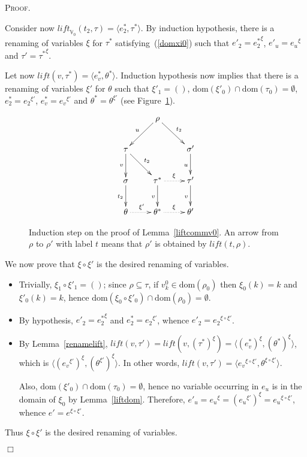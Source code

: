 \documentclass{article}
\newenvironment{proof}{\smallskip\textsc{Proof.}}{\hspace*{\fill}$\Box$}
\newcommand{\V}{{\mathbb V}}
\newcommand{\liftv}[1]{\ensuremath{\mathit{lift}_{\V_{#1}}}}
\newcommand{\lift}{\ensuremath{\mathit{lift}}}
\newcommand{\dom}{\ensuremath{\mathrm{dom}}}
\newcommand{\renamevar}[2]{\ensuremath{{#1}^{#2}}}
\newcommand{\isrenamevar}[3]{\ensuremath{{#1}=\renamevar{#2}{#3}}}
\newcommand{\idn}{()}
\begin{document}
\begin{proof}
\begin{enumerate}
Consider now $\liftv0(t_2,\tau)=\langle e^\ast_2,\tau^\ast\rangle$.
By induction hypothesis, there is a renaming of variables $\xi$ for
$\tau^\ast$ satisfying~(\ref{domxi0}) such that
{\isrenamevar{e'_2}{e^\ast_2}\xi}, {\isrenamevar{e'_u}{e_u}\xi} and
{\isrenamevar{\tau'}{\tau^\ast}\xi}.

Let now $\lift(v,\tau^\ast)=\langle e^\ast_v,\theta^\ast\rangle$.
Induction hypothesis now implies that there is a renaming of variables
$\xi'$ for $\theta$ such that $\xi'_1=\idn$,
$\dom(\xi'_0)\cap\dom(\tau_0)=\emptyset$,
{\isrenamevar{e^\ast_2}{e_2}{\xi'}},
{\isrenamevar{e^\ast_v}{e_v}{\xi'}} and
{\isrenamevar{\theta^\ast}\theta{\xi'}} (see
Figure~\ref{fig:liftcommv0}).
\begin{figure}[htb]
\[\xymatrix{
 & \rho \ar[dl]_{u} \ar[dr]^{t_2} \\
 \tau \ar[d]_{v} \ar[dr]^{t_2} & & \sigma' \ar[d]_{u} \\
 \sigma \ar[d]_{t_2} & \tau^\ast \ar@{.>}[r]^{\xi} \ar[d]_{v}
 & \tau' \ar[d]_{v} \\
 \theta \ar@{.>}[r]^{\xi'} & \theta^\ast \ar@{.>}[r]^{\xi} & \theta' 
}\]
\caption{Induction step on the proof of Lemma~\ref{liftcommv0}.  An arrow
from $\rho$ to $\rho'$ with label $t$ means that $\rho'$ is obtained
by $\lift(t,\rho)$.}
\label{fig:liftcommv0}
\end{figure}

We now prove that $\xi\circ\xi'$ is the desired renaming of variables.
\begin{itemize}
\item Trivially, $\xi_1\circ\xi'_1=\idn$; since $\rho\subseteq\tau$,
if $v^0_k\in\dom(\rho_0)$ then $\xi_0(k)=k$ and $\xi'_0(k)=k$, hence
$\dom(\xi_0\circ\xi'_0)\cap\dom(\rho_0)=\emptyset$.
\item By hypothesis, {\isrenamevar{e'_2}{e^\ast_2}\xi} and
{\isrenamevar{e^\ast_2}{e_2}{\xi'}}, whence
{\isrenamevar{e'_2}{e_2}{\xi\circ\xi'}}.
\item By Lemma~\ref{renamelift},
$\lift(v,\tau')=\lift(v,\renamevar{(\tau^\ast)}\xi)=%
\langle\renamevar{(e^\ast_v)}\xi,\renamevar{(\theta^\ast)}\xi\rangle$,
which is
$\langle\renamevar{(\renamevar{e_v}{\xi'})}\xi,%
\renamevar{(\renamevar\theta{\xi'})}\xi\rangle$.  In other words,
$\lift(v,\tau')=\langle\renamevar{e_v}{\xi\circ\xi'},%
\renamevar\theta{\xi\circ\xi'}\rangle$.

Also, $\dom(\xi'_0)\cap\dom(\tau_0)=\emptyset$, hence no variable
occurring in $e_u$ is in the domain of $\xi_0$ by Lemma~\ref{liftdom}.
Therefore,
$e'_u=\renamevar{e_u}\xi=\renamevar{(\renamevar{e_u}{\xi'})}\xi=%
\renamevar{e_u}{\xi\circ\xi'}$, whence
{\isrenamevar{e'}e{\xi\circ\xi'}}.
\end{itemize}
Thus $\xi\circ\xi'$ is the desired renaming of variables.
\end{enumerate}
\end{proof}
\end{document}
